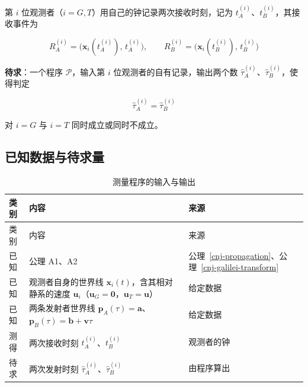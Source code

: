 \documentclass[
  chinese,
  a4paper,
  UTF8,
  12pt,
  oneside,
  openany]{ctexbook}
\theoremstyle{plain}
\theoremstyle{plain}
\theoremstyle{plain}
\theoremstyle{definition}
\theoremstyle{plain}
\theoremstyle{plain}
\theoremstyle{remark}
\begin{document}
第 \(i\) 位观测者（\(i=G,T\)）用自己的钟记录两次接收时刻，记为
\(t^{(i)}_{A}\)、\(t^{(i)}_{B}\)，其接收事件为

\[
R^{(i)}_{A}=\bigl(\mathbf{x}_{i}(t^{(i)}_{A}),\,t^{(i)}_{A}\bigr),\qquad
R^{(i)}_{B}=\bigl(\mathbf{x}_{i}(t^{(i)}_{B}),\,t^{(i)}_{B}\bigr)
\]

\textbf{待求}：一个程序 \(\mathcal{P}\)，输入第 \(i\)
位观测者的自有记录，输出两个数
\(\widehat{\tau}^{(i)}_{A}\)、\(\widehat{\tau}^{(i)}_{B}\)，使得判定

\[
\widehat{\tau}^{(i)}_{A}=\widehat{\tau}^{(i)}_{B}
\]

对 \(i=G\) 与 \(i=T\) 同时成立或同时不成立。

\subsection{已知数据与待求量}\label{ux5df2ux77e5ux6570ux636eux4e0eux5f85ux6c42ux91cf}

\begin{longtable}[]{@{}
  >{\raggedright\arraybackslash}p{}
  >{\raggedright\arraybackslash}p{}
  >{\raggedright\arraybackslash}p{}@{}}
\caption{测量程序的输入与输出}\label{tbl-measurement-data}\tabularnewline
\toprule\noalign{}
\begin{minipage}[b]{\linewidth}\raggedright
类别
\end{minipage} & \begin{minipage}[b]{\linewidth}\raggedright
内容
\end{minipage} & \begin{minipage}[b]{\linewidth}\raggedright
来源
\end{minipage} \\
\midrule\noalign{}
\endfirsthead
\toprule\noalign{}
\begin{minipage}[b]{\linewidth}\raggedright
类别
\end{minipage} & \begin{minipage}[b]{\linewidth}\raggedright
内容
\end{minipage} & \begin{minipage}[b]{\linewidth}\raggedright
来源
\end{minipage} \\
\midrule\noalign{}
\endhead
\bottomrule\noalign{}
\endlastfoot
已知 & 公理 A1、A2 &
公理~\ref{cnj-propagation}、公理~\ref{cnj-galilei-transform} \\
已知 & 观测者自身的世界线 \(\mathbf{x}_{i}(t)\)，含其相对静系的速度
\(\mathbf{u}_{i}\)（\(\mathbf{u}_{G}=\mathbf{0}\)，\(\mathbf{u}_{T}=\mathbf{u}\)）
& 给定数据 \\
已知 & 两条发射者世界线
\(\mathbf{p}_{A}(\tau)=\mathbf{a}\)、\(\mathbf{p}_{B}(\tau)=\mathbf{b}+\mathbf{v}\tau\)
& 给定数据 \\
测得 & 两次接收时刻 \(t^{(i)}_{A}\)、\(t^{(i)}_{B}\) & 观测者的钟 \\
待求 & 两次发射时刻
\(\widehat{\tau}^{(i)}_{A}\)、\(\widehat{\tau}^{(i)}_{B}\) &
由程序算出 \\
\end{longtable}
\end{document}
